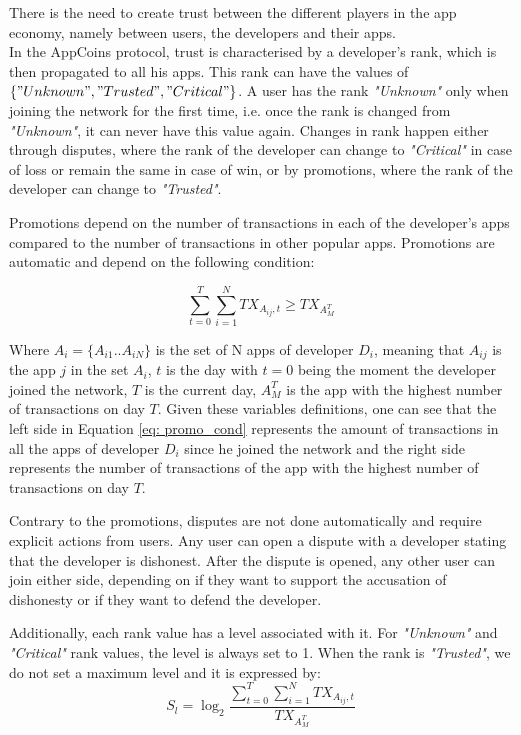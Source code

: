 There is the need to create trust between the different players in the app economy, namely between users, the developers and their apps. \\

In the AppCoins protocol, trust is characterised by a developer's rank, which is then propagated to all his apps. This rank can have the values of $\{"Unknown", "Trusted", "Critical"\}$. A user has the rank \textit{"Unknown"} only when joining the network for the first time, i.e. once the rank is changed from \textit{"Unknown"}, it can never have this value again. Changes in rank happen either through disputes, where the rank of the developer can change to \textit{"Critical"} in case of loss or remain the same in case of win, or by promotions, where the rank of the developer can change to \textit{"Trusted"}.

Promotions depend on the number of transactions in each of the developer's apps compared to the number of transactions in other popular apps. Promotions are automatic and depend on the following condition:

\begin{equation}
\sum\limits_{t=0}^{T} \sum\limits_{i=1}^{N} TX_{A_{ij},t} \geq TX_{A^{T}_{M}}
\label{eq: promo_cond}
\end{equation}

Where $A_i = \{A_{i1}..A_{iN}\}$ is the set of N apps of developer $D_i$, meaning that $A_{ij}$ is the app $j$ in the set $A_i$, $t$ is the day with $t=0$ being the moment the developer joined the network, $T$ is the current day, $A^{T}_{M}$ is the app with the highest number of transactions on day $T$. Given these variables definitions, one can see that the left side in Equation \ref{eq: promo_cond} represents the amount of transactions in all the apps of developer $D_i$ since he joined the network and the right side represents the number of transactions of the app with the highest number of transactions on day $T$.

Contrary to the promotions, disputes are not done automatically and require explicit actions from users. Any user can open a dispute with a developer stating that the developer is dishonest. After the dispute is opened, any other user can join either side, depending on if they want to support the accusation of dishonesty or if they want to defend the developer.

Additionally, each rank value has a level associated with it. For \textit{"Unknown"} and \textit{"Critical"} rank values, the level is always set to 1. When the rank is \textit{"Trusted"}, we do not set a maximum level and it is expressed by:
\begin{equation}
S_l = \log_2 \frac{\sum\limits_{t=0}^{T} \sum\limits_{i=1}^{N} TX_{A_{ij},t}}{TX_{A^{T}_{M}}}
\label{eq: rank_level}
\end{equation}

